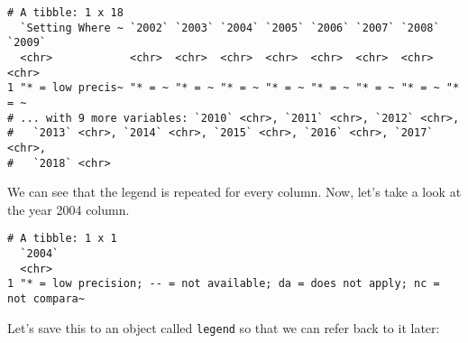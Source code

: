 \documentclass[
]{article}
\newenvironment{Shaded}{\begin{snugshade}}{\end{snugshade}}
\newcommand{\DataTypeTok}[1]{\textcolor[rgb]{0.13,0.29,0.53}{#1}}
\newcommand{\DecValTok}[1]{\textcolor[rgb]{0.00,0.00,0.81}{#1}}
\newcommand{\FloatTok}[1]{\textcolor[rgb]{0.00,0.00,0.81}{#1}}
\newcommand{\KeywordTok}[1]{\textcolor[rgb]{0.13,0.29,0.53}{\textbf{#1}}}
\newcommand{\NormalTok}[1]{#1}
\newcommand{\OperatorTok}[1]{\textcolor[rgb]{0.81,0.36,0.00}{\textbf{#1}}}
\newcommand{\StringTok}[1]{\textcolor[rgb]{0.31,0.60,0.02}{#1}}
\begin{document}
\begin{verbatim}
# A tibble: 1 x 18
  `Setting Where ~ `2002` `2003` `2004` `2005` `2006` `2007` `2008` `2009`
  <chr>            <chr>  <chr>  <chr>  <chr>  <chr>  <chr>  <chr>  <chr> 
1 "* = low precis~ "* = ~ "* = ~ "* = ~ "* = ~ "* = ~ "* = ~ "* = ~ "* = ~
# ... with 9 more variables: `2010` <chr>, `2011` <chr>, `2012` <chr>,
#   `2013` <chr>, `2014` <chr>, `2015` <chr>, `2016` <chr>, `2017` <chr>,
#   `2018` <chr>
\end{verbatim}

We can see that the legend is repeated for every column. Now, let's take
a look at the year 2004 column.

\begin{Shaded}
\end{Shaded}

\begin{verbatim}
# A tibble: 1 x 1
  `2004`                                                                        
  <chr>                                                                         
1 "* = low precision; -- = not available; da = does not apply; nc = not compara~
\end{verbatim}

Let's save this to an object called \texttt{legend} so that we can refer
back to it later:

\begin{Shaded}
\end{Shaded}
\end{document}
